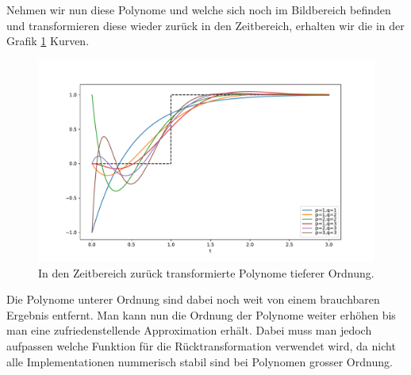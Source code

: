Nehmen wir nun diese Polynome und welche sich noch im Bildbereich befinden und transformieren diese wieder zurück in den Zeitbereich, erhalten wir die in der Grafik \ref{pade:totzeitexp2} Kurven.
\begin{figure}
	\centering
	\includegraphics[width=1\linewidth]{./papers/pade/python/bilder/padelow33.pdf}
	\caption{In den Zeitbereich zurück transformierte Polynome tieferer Ordnung\label{pade:totzeitexp2}.}
\end{figure}

Die Polynome unterer Ordnung sind dabei noch weit von einem brauchbaren Ergebnis entfernt.
Man kann nun die Ordnung der Polynome weiter erhöhen bis man eine zufriedenstellende Approximation erhält.
Dabei muss man jedoch aufpassen welche Funktion für die Rücktransformation verwendet wird, da nicht alle Implementationen nummerisch stabil sind bei Polynomen grosser Ordnung.


